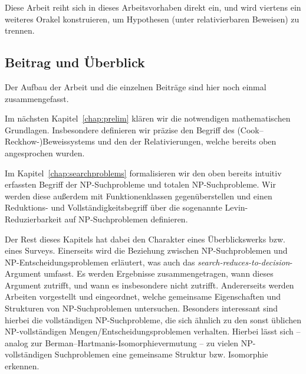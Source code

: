 Diese Arbeit reiht sich in dieses Arbeitsvorhaben direkt ein, und wird viertens ein weiteres Orakel konstruieren, um Hypothesen (unter relativierbaren Beweisen) zu trennen.

\subsection*{Beitrag und Überblick}

Der Aufbau der Arbeit und die einzelnen Beiträge sind hier noch einmal zusammengefasst.

Im nächsten Kapitel~\ref{chap:prelim} klären wir die notwendigen mathematischen Grundlagen. Insbesondere definieren wir präzise den Begriff des (Cook–Reckhow-)Beweissystems und den der Relativierungen, welche bereits oben angesprochen wurden.

Im Kapitel~\ref{chap:searchproblems} formalisieren wir den oben bereits intuitiv erfassten Begriff der NP-Suchprobleme und totalen NP-Suchprobleme. 
Wir werden diese außerdem mit Funktionenklassen gegenüberstellen und einen Reduktions- und Vollständigkeitsbegriff über die sogenannte Levin-Reduzierbarkeit auf NP-Suchproblemen definieren.

Der Rest dieses Kapitels hat dabei den Charakter eines Überblickswerks bzw. eines Surveys. 
Einerseits wird die Beziehung zwischen NP-Suchproblemen und NP-Entscheidungsproblemen erläutert, was auch das \emph{search-reduces-to-decision}-Argument umfasst. Es werden Ergebnisse zusammengetragen, wann dieses Argument zutrifft, und wann es insbesondere nicht zutrifft.
Andererseits werden Arbeiten vorgestellt und eingeordnet, welche gemeinsame Eigenschaften und Strukturen von NP-Suchproblemen untersuchen. Besonders interessant sind hierbei die vollständigen NP-Suchprobleme, die sich ähnlich zu den sonst üblichen NP-vollständigen Mengen/Entscheidungsproblemen verhalten. Hierbei lässt sich – analog zur Berman–Hartmanis-Isomorphievermutung – zu vielen NP-vollständigen Suchproblemen eine gemeinsame Struktur bzw. Isomorphie erkennen.

